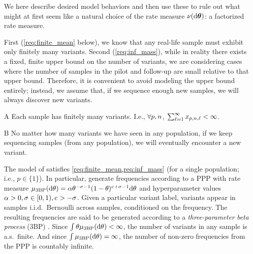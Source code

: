We here describe desired model behaviors and then use these to rule out what
might at first seem like a natural choice of the rate measure $\nu(\mathrm{d}\boldsymbol{\theta})$: a factorized rate measure.

First (\cref{req:finite_mean} below), we know that any real-life sample must exhibit only finitely many variants. Second (\cref{req:inf_mass}), while in reality there exists a fixed, finite upper bound on the number of variants,
we are considering cases where the number of samples in the pilot and follow-up are small relative to that upper bound.
Therefore, it is 
convenient to avoid modeling the upper bound entirely;
instead, we assume that, if we sequence enough new samples, we will always discover new variants.
\begin{desideratap}{A}
	Each sample has finitely many variants. 
	I.e., $\forall p, n$, $\sum_{\ell = 1}^{\infty} x_{p,n,\ell} < \infty$.
	\label{req:finite_mean}
\end{desideratap}
\begin{desideratap}{B}
	No matter how many variants we have seen in any population, if we keep sequencing samples (from any population), we will eventually encounter a new variant.
	\label{req:inf_mass}
\end{desideratap}

The model of \citet{Masoero2022} satisfies \cref{req:finite_mean,req:inf_mass} (for a single population; i.e., $p \in \{1\}$).
In particular, \citet{Masoero2022} generate frequencies according to a PPP with rate measure
$\mu_{\mathrm{3BP}}(\mathrm{d}\theta)= \alpha{} \theta^{-\sigma_{}-1}(1-\theta)^{c_{}+\sigma_{}-1}\mathrm{d}\theta$
and hyperparameter values $\alpha>0, \sigma_{} \in [0,1), c_{}>-\sigma_{}$.
Given a particular variant label, variants appear in samples i.i.d.\ Bernoulli across samples, conditioned
on the frequency.
The resulting frequencies are said to be generated according to a \emph{three-parameter
beta process} (3BP) \citep{teh2009indian,Broderick2012,james2017bayesian}.
Since $\int \theta \mu_{\mathrm{3BP}}(\mathrm{d}\theta)<\infty$, 
the number of variants in any sample is a.s.\ finite. And since $\int \mu_{\mathrm{3BP}}(\mathrm{d}\theta)=\infty$,
the number of non-zero frequencies from the PPP is countably infinite.

